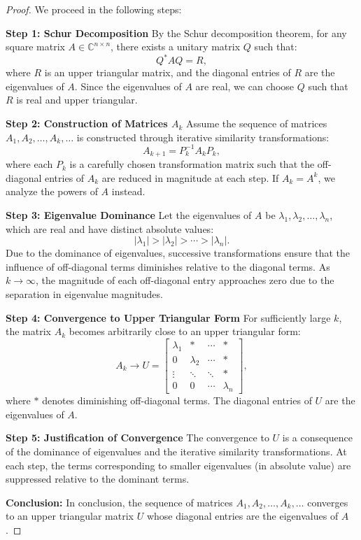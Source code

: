 \documentclass[12pt]{article}
\begin{document}
\begin{proof}
We proceed in the following steps:

\textbf{Step 1: Schur Decomposition}  
By the Schur decomposition theorem, for any square matrix $A \in \mathbb{C}^{n \times n}$, there exists a unitary matrix $Q$ such that:
\[
Q^* A Q = R,
\]
where $R$ is an upper triangular matrix, and the diagonal entries of $R$ are the eigenvalues of $A$. Since the eigenvalues of $A$ are real, we can choose $Q$ such that $R$ is real and upper triangular.

\textbf{Step 2: Construction of Matrices $A_k$}  
Assume the sequence of matrices $A_1, A_2, \dots, A_k, \dots$ is constructed through iterative similarity transformations:
\[
A_{k+1} = P_k^{-1} A_k P_k,
\]
where each $P_k$ is a carefully chosen transformation matrix such that the off-diagonal entries of $A_k$ are reduced in magnitude at each step. If $A_k = A^k$, we analyze the powers of $A$ instead.

\textbf{Step 3: Eigenvalue Dominance}  
Let the eigenvalues of $A$ be $\lambda_1, \lambda_2, \dots, \lambda_n$, which are real and have distinct absolute values:
\[
|\lambda_1| > |\lambda_2| > \cdots > |\lambda_n|.
\]
Due to the dominance of eigenvalues, successive transformations ensure that the influence of off-diagonal terms diminishes relative to the diagonal terms. As $k \to \infty$, the magnitude of each off-diagonal entry approaches zero due to the separation in eigenvalue magnitudes.

\textbf{Step 4: Convergence to Upper Triangular Form}  
For sufficiently large $k$, the matrix $A_k$ becomes arbitrarily close to an upper triangular form:
\[
A_k \to U = \begin{bmatrix}
\lambda_1 & * & \cdots & * \\
0 & \lambda_2 & \cdots & * \\
\vdots & \ddots & \ddots & * \\
0 & 0 & \cdots & \lambda_n
\end{bmatrix},
\]
where $*$ denotes diminishing off-diagonal terms. The diagonal entries of $U$ are the eigenvalues of $A$.

\textbf{Step 5: Justification of Convergence}  
The convergence to $U$ is a consequence of the dominance of eigenvalues and the iterative similarity transformations. At each step, the terms corresponding to smaller eigenvalues (in absolute value) are suppressed relative to the dominant terms.

\textbf{Conclusion:}  
In conclusion, the sequence of matrices $A_1, A_2, \dots, A_k, \dots$ converges to an upper triangular matrix $U$ whose diagonal entries are the eigenvalues of $A$.

\end{proof}
\end{document}
